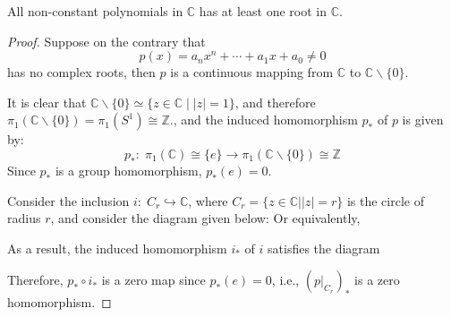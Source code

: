 \begin{corollary}  All non-constant polynomials in \(\mathbb{C}\) has at least one root in \(\mathbb{C}\).
\end{corollary}
\begin{proof} Suppose on the contrary that
\[
p\left( x\right)  = {a}_{n}{x}^{n} + \cdots  + {a}_{1}x + {a}_{0} \neq  0
\]
has no complex roots, then \(p\) is a continuous mapping from \(\mathbb{C}\) to \(\mathbb{C} \smallsetminus  \{ 0\}\). 

It is clear that \(\mathbb{C} \smallsetminus  \{ 0\}  \simeq  \{ z \in \mathbb{C} \mid  \left| z\right|  = 1\}\), and therefore
\(
{\pi }_{1}\left( {\mathbb{C}\smallsetminus \{ 0\} }\right)  = {\pi }_{1}\left( {S}^{1}\right)  \cong  \mathbb{Z}.
\), and the induced homomorphism \({p}_*\) of \(p\) is given by:
\[
{p}_{ * }: \;{\pi }_{1}\left( \mathbb{C}\right) \cong \{e\} \rightarrow  {\pi }_{1}\left( {\mathbb{C}\smallsetminus \{ 0\} }\right) \cong \mathbb{Z}
\]
Since $p_*$ is a group homomorphism, \({p}_{ * }\left( e\right)  = 0\).

Consider the inclusion 
$i: \;{C}_{r} \hookrightarrow  \mathbb{C}$, where \({C}_{r} = \{ z \in  \mathbb{C}\left| \right| z \mid   = r\}\) is the circle of radius $r$, and consider
the diagram given below: Or equivalently,
\begin{center}
\end{center}
As a result, the induced homomorphism \({i}_{ * }\) of \(i\) satisfies the diagram

\begin{center}
\end{center}
Therefore, \({p}_{ * } \circ  {i}_{ * }\) is a zero map since \({p}_{ * }\left( e\right)  = 0\), i.e., \({\left( {\left. p\right| }_{{C}_{r}}\right) }_{ * }\) is a zero homomorphism.


\end{proof}
